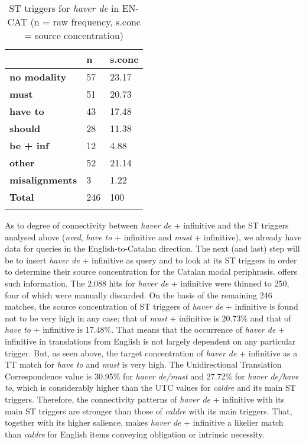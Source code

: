 \documentclass[output=paper,english,spanish,german,english]{langsci/langscibook}
\begin{document}
\begin{table}[b]
\caption{ST triggers for \textit{haver de} in EN-CAT (n = raw frequency, s.conc = source concentration)}\label{haver-trig}
  \begin{tabularx}{\textwidth}{lYY}
    \lsptoprule
    & {\bfseries n} & {\bfseries s.conc}\\
    \midrule
    {\bfseries no modality}   & 57  & 23.17\\
    {\bfseries must}          & 51  & 20.73\\
    {\bfseries have to}       & 43  & 17.48\\
    {\bfseries should}        & 28  & 11.38\\
    {\bfseries be + inf}      & 12  & 4.88\\
    {\bfseries other}         & 52  & 21.14\\
    {\bfseries misalignments} & 3   & 1.22\\
    \midrule
    {\bfseries Total}         & 246 & 100\\
    \lspbottomrule
  \end{tabularx}
\end{table}
As to degree of connectivity between \textit{haver de} + infinitive and the ST triggers analysed above (\textit{need}, \textit{have to} + infinitive and \textit{must} + infinitive), we already have data for queries in the English-to-Catalan direction. The next (and last) step will be to insert \textit{haver de} + infinitive as query and to look at its ST triggers in order to determine their source concentration for the Catalan modal periphrasis.  offers such information. The 2,088 hits for \textit{haver de} + infinitive were thinned to 250, four of which were manually discarded. On the basis of the remaining 246 matches, the source concentration of ST triggers of \textit{haver de} + infinitive is found not to be very high in any case; that of \textit{must} + infinitive is 20.73\% and that of \textit{have to} + infinitive is 17.48\%. That means that the occurrence of \textit{haver de }+ infinitive in translations from English is not largely dependent on any particular trigger. But, as seen above, the target concentration of \textit{haver de} + infinitive as a TT match for \textit{have to }and \textit{must} is very high. The Unidirectional Translation Correspondence value is 30.95\% for \textit{haver de/must} and 27.72\% for \textit{haver de/have to}, which is considerably higher than the UTC values for \textit{caldre} and its main ST triggers. Therefore, the connectivity patterns of \textit{haver de} + infinitive with its main ST triggers are stronger than those of \textit{caldre} with its main triggers. That, together with its higher salience, makes \textit{haver de} + infinitive a likelier match than \textit{caldre} for English items conveying obligation or intrinsic necessity.
\end{document}
